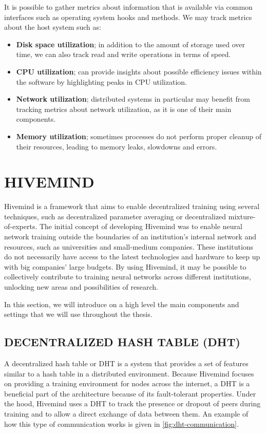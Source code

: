 It is possible to gather metrics about information that is available via common interfaces such as operating system hooks and methods.
We may track metrics about the host system such as:
\begin{itemize}
    \item \textbf{Disk space utilization}; in addition to the amount of storage used over time, we can also track read and write operations in terms of speed.
    \item \textbf{CPU utilization}; can provide insights about possible efficiency issues within the software by highlighting peaks in CPU utilization.
    \item \textbf{Network utilization}; distributed systems in particular may benefit from tracking metrics about network utilization, as it is one of their main components.
    \item \textbf{Memory utilization}; sometimes processes do not perform proper cleanup of their resources, leading to memory leaks, slowdowns and errors.
\end{itemize}

\section{HIVEMIND}
Hivemind is a framework that aims to enable decentralized training using several techniques, such as decentralized parameter averaging or decentralized mixture-of-experts.
The initial concept of developing Hivemind was to enable neural network training outside the boundaries of an institution's internal network and resources, such as universities and small-medium companies.
These institutions do not necessarily have access to the latest technologies and hardware to keep up with big companies' large budgets.
By using Hivemind, it may be possible to collectively contribute to training neural networks across different institutions, unlocking new areas and possibilities of research.

In this section, we will introduce on a high level the main components and settings that we will use throughout the thesis.

\subsection{DECENTRALIZED HASH TABLE (DHT)}
A decentralized hash table or DHT is a system that provides a set of features similar to a hash table in a distributed environment.
Because Hivemind focuses on providing a training environment for nodes across the internet, a DHT is a beneficial part of the architecture because of its fault-tolerant properties.
Under the hood, Hivemind uses a DHT to track the presence or dropout of peers during training and to allow a direct exchange of data between them.
An example of how this type of communication works is given in \autoref{fig:dht-communication}.

